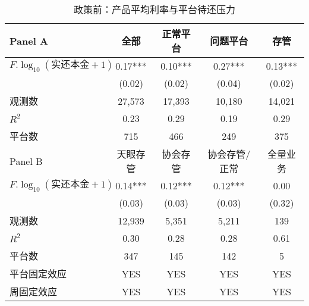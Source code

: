 \documentclass[lang=cn,11pt]{elegantpaper}
\begin{document}
\begin{table}[htbp]
  \centering
  \caption{政策前：产品平均利率与平台待还压力}
    \begin{tabular}{lcccc}
    \toprule
    Panel A & 全部    & 正常平台  & 问题平台  & 存管 \\
    \midrule
    $F.\log_{10}(\text{实还本金}+1)$ & 0.17*** & 0.10*** & 0.27*** & 0.13*** \\
          & (0.02) & (0.02) & (0.04) & (0.02) \\
    观测数   & 27,573 & 17,393 & 10,180 & 14,021 \\
    $R^{2}$    & 0.23  & 0.29  & 0.19  & 0.29 \\
    平台数   & 715   & 466   & 249   & 375 \\
    \midrule
    Panel B & 天眼存管  & 协会存管  & 协会存管/正常 & 全量业务 \\
    \midrule
    $F.\log_{10}(\text{实还本金}+1)$ & 0.14*** & 0.12*** & 0.12*** & 0.00 \\
          & (0.03) & (0.03) & (0.03) & (0.32) \\
    观测数   & 12,939 & 5,351 & 5,211 & 139 \\
    $R^{2}$    & 0.30  & 0.28  & 0.28  & 0.61 \\
    平台数   & 347   & 145   & 142   & 5 \\
    平台固定效应 & YES   & YES   & YES   & YES \\
    周固定效应 & YES   & YES   & YES   & YES \\
    \bottomrule
    \end{tabular}%
  \label{tab:policy_before}%
\end{table}%
\end{document}

